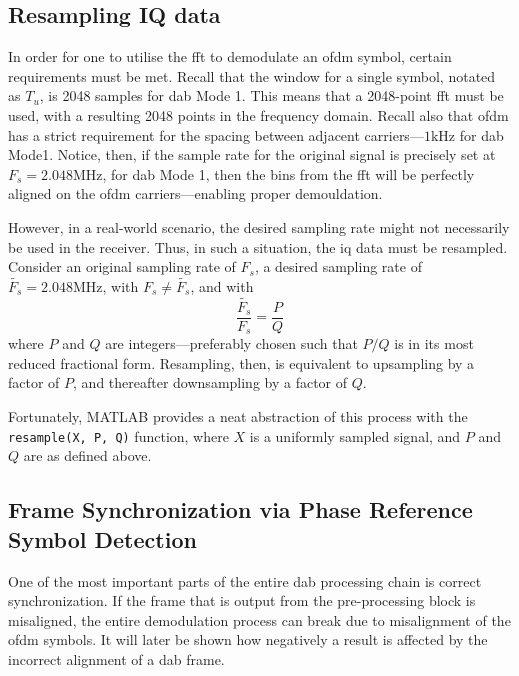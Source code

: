 \documentclass[class=report,11pt,crop=false]{standalone}
\begin{document}
\subsection{Resampling IQ data \label{subsect:dab-proc_iq-resample}}
In order for one to utilise the \gls{fft} to demodulate an \gls{ofdm} symbol, certain requirements must be met. Recall that the window for a single symbol, notated as \(T_u\), is 2048 samples for \gls{dab} Mode 1. This means that a 2048-point \gls{fft} must be used, with a resulting 2048 points in the frequency domain. Recall also that \gls{ofdm} has a strict requirement for the spacing between adjacent carriers---\(1 \si{\kilo \hertz}\) for \gls{dab} Mode1. Notice, then, if the sample rate for the original signal is precisely set at \(F_s = 2.048 \si{\mega \hertz}\), for \gls{dab} Mode 1, then the bins from the \gls{fft} will be perfectly aligned on the \gls{ofdm} carriers---enabling proper demouldation.

However, in a real-world scenario, the desired sampling rate might not necessarily be used in the receiver. Thus, in such a situation, the \gls{iq} data must be resampled. Consider an original sampling rate of \(F_s\), a desired sampling rate of \(\tilde{F_s} = 2.048 \si{\mega \hertz}\), with \(F_s \ne \tilde{F_s}\), and with
\begin{equation}
  \frac{\tilde{F_s}}{F_s} = \frac{P}{Q}
\end{equation}
where \(P\) and \(Q\) are integers---preferably chosen such that \(P/Q\) is in its most reduced fractional form. Resampling, then, is equivalent to upsampling by a factor of \(P\), and thereafter downsampling by a factor of \(Q\).

Fortunately, MATLAB provides a neat abstraction of this process with the \texttt{resample(X, P, Q)} function, where \(X\) is a uniformly sampled signal, and \(P\) and \(Q\) are as defined above.

\subsection{Frame Synchronization via Phase Reference Symbol Detection \label{subsect:dab-proc_prs-detect}}

One of the most important parts of the entire \gls{dab} processing chain is correct synchronization. If the frame that is output from the pre-processing block is misaligned, the entire demodulation process can break due to misalignment of the \gls{ofdm} symbols. It will later be shown how negatively a result is affected by the incorrect alignment of a \gls{dab} frame.
\end{document}
